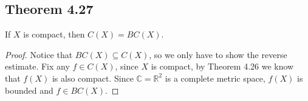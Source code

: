 \documentclass[../../main.tex]{subfiles}
\begin{document}
\subsection{Theorem 4.27}
\begin{wts}
If $X$ is compact, then $C(X)=BC(X)$.
\end{wts}
\begin{proof}
Notice that $BC(X)\subseteq C(X)$, so we only have to show the reverse estimate. Fix any $f\in C(X)$, since $X$ is compact, by Theorem 4.26 we know that $f(X)$ is also compact. Since $\mathbb{C}=\mathbb{R}^2$ is a complete metric space, $f(X)$ is bounded and $f\in BC(X)$.
\end{proof}
\end{document}
